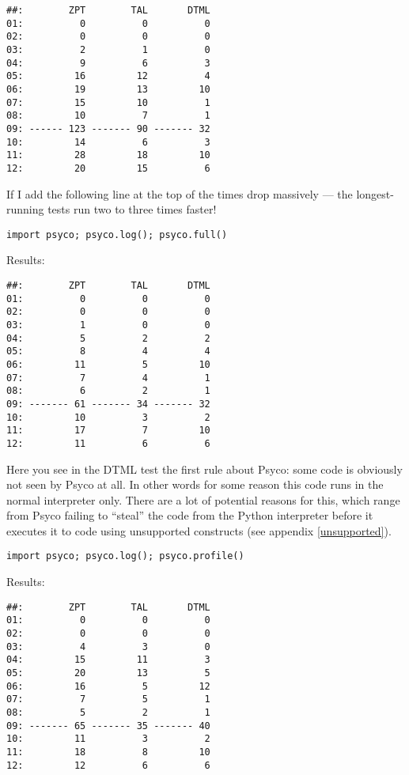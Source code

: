 \documentclass{manual}
\begin{document}
\begin{verbatim}
##:        ZPT        TAL       DTML
01:          0          0          0
02:          0          0          0
03:          2          1          0
04:          9          6          3
05:         16         12          4
06:         19         13         10
07:         15         10          1
08:         10          7          1
09: ------ 123 ------- 90 ------- 32
10:         14          6          3
11:         28         18         10
12:         20         15          6
\end{verbatim}

If I add the following line at the top of  the times drop massively --- the longest-running tests run two to three times faster!

\begin{verbatim}
import psyco; psyco.log(); psyco.full()
\end{verbatim}

Results:

\begin{verbatim}
##:        ZPT        TAL       DTML
01:          0          0          0
02:          0          0          0
03:          1          0          0
04:          5          2          2
05:          8          4          4
06:         11          5         10
07:          7          4          1
08:          6          2          1
09: ------- 61 ------- 34 ------- 32
10:         10          3          2
11:         17          7         10
12:         11          6          6
\end{verbatim}

Here you see in the DTML test the first rule about Psyco: some code is obviously not seen by Psyco at all.  In other words for some reason this code runs in the normal interpreter only.  There are a lot of potential reasons for this, which range from Psyco failing to ``steal'' the code from the Python interpreter before it executes it to code using unsupported constructs (see appendix \ref{unsupported}).

\begin{verbatim}
import psyco; psyco.log(); psyco.profile()
\end{verbatim}

Results:

\begin{verbatim}
##:        ZPT        TAL       DTML
01:          0          0          0
02:          0          0          0
03:          4          3          0
04:         15         11          3
05:         20         13          5
06:         16          5         12
07:          7          5          1
08:          5          2          1
09: ------- 65 ------- 35 ------- 40
10:         11          3          2
11:         18          8         10
12:         12          6          6
\end{verbatim}
\end{document}
